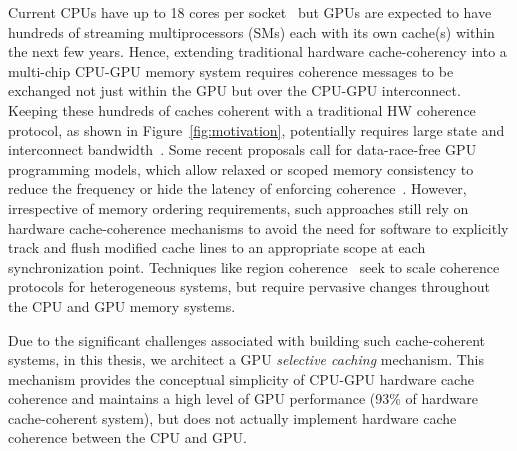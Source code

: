 Current CPUs have up to 18 cores per socket~\cite{INTELXEONE5V3} but GPUs are
expected to have hundreds of streaming multiprocessors (SMs) each with its own
cache(s) within the next few years. Hence, extending traditional hardware
cache-coherency into a multi-chip CPU-GPU memory system requires coherence
messages to be exchanged not just within the GPU but over the CPU-GPU
interconnect. Keeping these hundreds of caches coherent with a traditional HW
coherence protocol, as shown in Figure~\ref{fig:motivation}, potentially
requires large state and interconnect bandwidth~\cite{Kelm2010,johnson2011}.
Some recent proposals call for data-race-free GPU programming models, which
allow relaxed or scoped memory consistency to reduce the frequency or hide the
latency of enforcing coherence~\cite{Hechtman2014}.  However, irrespective of
memory ordering requirements, such approaches still rely on hardware
cache-coherence mechanisms to  avoid the need for software to explicitly track
and flush modified cache lines to an appropriate scope at each synchronization
point. Techniques like region coherence~\cite{Power2013} seek to scale coherence
protocols for heterogeneous systems, but require pervasive changes throughout
the CPU and GPU memory systems.

Due to the significant challenges associated with building such cache-coherent
systems, in this thesis, we architect a GPU \textit{selective caching}
mechanism.  This mechanism provides the conceptual simplicity of CPU-GPU
hardware cache coherence and maintains a high level of GPU performance (93\% of
hardware cache-coherent system), but does not actually implement hardware cache
coherence between the CPU and GPU.

